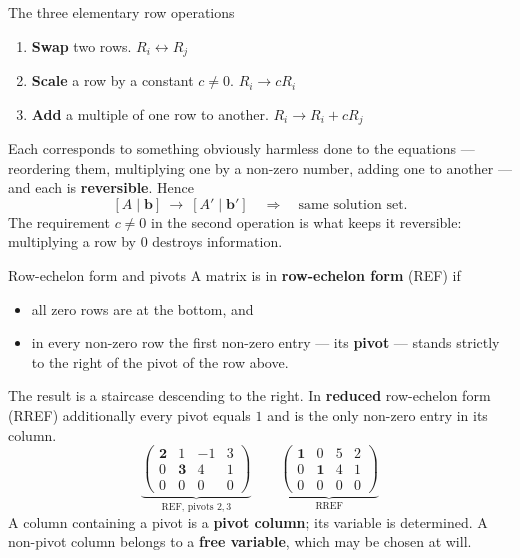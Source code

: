 \begin{rulebox}{The three elementary row operations}
\begin{enumerate}[leftmargin=1.8em,itemsep=0.3ex]
  \item \textbf{Swap} two rows. \hfill $R_{i}\leftrightarrow R_{j}$
  \item \textbf{Scale} a row by a constant $c\neq0$. \hfill $R_{i}\to cR_{i}$
  \item \textbf{Add} a multiple of one row to another. \hfill
        $R_{i}\to R_{i}+cR_{j}$
\end{enumerate}
Each corresponds to something obviously harmless done to the equations ---
reordering them, multiplying one by a non-zero number, adding one to
another --- and each is \textbf{reversible}. Hence
\[
  [A\mid\mathbf{b}]\ \longrightarrow\ [A'\mid\mathbf{b}']
  \quad\Longrightarrow\quad
  \text{same solution set.}
\]
The requirement $c\neq0$ in the second operation is what keeps it
reversible: multiplying a row by $0$ destroys information.
\end{rulebox}

\begin{rulebox}{Row-echelon form and pivots}
A matrix is in \textbf{row-echelon form} (REF) if
\begin{itemize}[leftmargin=1.6em,itemsep=0.2ex]
  \item all zero rows are at the bottom, and
  \item in every non-zero row the first non-zero entry --- its
        \textbf{pivot} --- stands strictly to the right of the pivot of the
        row above.
\end{itemize}
The result is a staircase descending to the right. In \textbf{reduced}
row-echelon form (RREF) additionally every pivot equals $1$ and is the only
non-zero entry in its column.
\[
  \underbrace{\begin{pmatrix}
    \mathbf{2} & 1 & -1 & 3\\
    0 & \mathbf{3} & 4 & 1\\
    0 & 0 & 0 & 0
  \end{pmatrix}}_{\text{REF, pivots }2,3}
  \qquad
  \underbrace{\begin{pmatrix}
    \mathbf{1} & 0 & 5 & 2\\
    0 & \mathbf{1} & 4 & 1\\
    0 & 0 & 0 & 0
  \end{pmatrix}}_{\text{RREF}}
\]
A column containing a pivot is a \textbf{pivot column}; its variable is
determined. A non-pivot column belongs to a \textbf{free variable}, which
may be chosen at will.
\end{rulebox}

